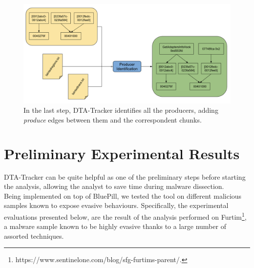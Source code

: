 \documentclass[LaM,binding=0.6cm]{sapthesis}
\begin{document}
\begin{figure}[h!]
\centering
\includegraphics[scale=.425]{images/dtatracker6}
\caption{In the last step, DTA-Tracker identifies all the producers, adding \textit{produce} edges between them and the correspondent chunks.}
\end{figure}

\section{Preliminary Experimental Results}
\label{sec:evaluations}
DTA-Tracker can be quite helpful as one of the preliminary steps before starting the analysis, allowing the analyst to save time during malware dissection.\\
Being implemented on top of BluePill, we tested the tool on different malicious samples known to expose evasive behaviours. Specifically, the experimental evaluations presented below, are the result of the analysis performed on Furtim\footnote{https://www.sentinelone.com/blog/sfg-furtims-parent/.}, a malware sample known to be highly evasive thanks to a large number of assorted techniques.
\end{document}
